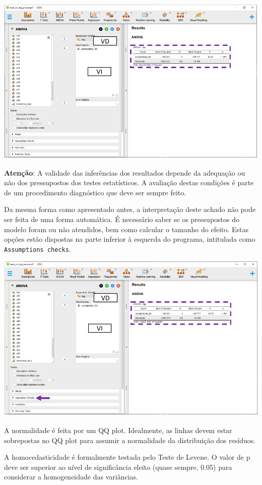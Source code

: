 \documentclass[
]{book}
\begin{document}
\includegraphics{./img/cap_anova_resultados_iniciais.png}

\textbf{Atenção}: A validade das inferências dos resultados depende da adequação ou não dos pressupostos dos testes estatísticos. A avaliação destas condições é parte de um procedimento diagnóstico que deve ser sempre feito.

Da mesma forma como apresentado antes, a interpretação deste achado não pode ser feita de uma forma automática. É necessário saber se os pressupostos do modelo foram ou não atendidos, bem como calcular o tamanho do efeito. Estas opções estão dispostas na parte inferior à esquerda do programa, intitulada como \texttt{Assumptions\ checks}.

\includegraphics{./img/cap_anova_assumptions.png}

A normalidade é feita por um QQ plot. Idealmente, as linhas devem estar sobrepostas no QQ plot para assumir a normalidade da distribuição dos resíduos.

A homocedasticidade é formalmente testada pelo Teste de Levene. O valor de p deve ser superior ao nível de significância eleito (quase sempre, 0.05) para considerar a homogeneidade das variâncias.
\end{document}
